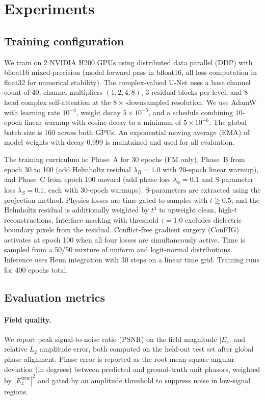 \section{\label{sec:experiments}Experiments}

\subsection{Training configuration}

We train on 2 NVIDIA H200 GPUs using distributed data parallel (DDP) with bfloat16 mixed-precision (model forward pass
in bfloat16, all loss computation in float32 for numerical stability). The complex-valued U-Net uses a base channel
count of 40, channel multipliers $(1, 2, 4, 8)$, 3 residual blocks per level, and 8-head complex self-attention at the
$8\times$-downsampled resolution. We use AdamW~\cite{Loshchilov2019AdamW} with learning rate $10^{-4}$, weight decay
$5 \times 10^{-5}$, and a schedule combining 10-epoch linear warmup with cosine decay to a minimum of $5 \times
10^{-6}$. The global batch size is 160 across both GPUs. An exponential moving average (EMA) of model weights with
decay 0.999 is maintained and used for all evaluation.

The training curriculum is: Phase~A for 30 epochs (FM only), Phase~B from epoch 30 to 100 (add Helmholtz residual
$\lambda_R = 1.0$ with 20-epoch linear warmup), and Phase~C from epoch 100 onward (add phase loss $\lambda_\phi =
0.1$ and S-parameter loss $\lambda_S = 0.1$, each with 30-epoch warmups). S-parameters are extracted using the
projection method. Physics losses are time-gated to samples with $t \geq 0.5$, and the Helmholtz residual is
additionally weighted by $t^4$ to upweight clean, high-$t$ reconstructions. Interface masking with threshold $\tau =
1.0$ excludes dielectric boundary pixels from the residual. Conflict-free gradient surgery
(ConFIG)~\cite{ConFIG2025} activates at epoch 100 when all four losses are simultaneously active.
Time is sampled from a 50/50 mixture of uniform and logit-normal distributions. Inference uses Heun integration with
30 steps on a linear time grid. Training runs for 400 epochs total.

\subsection{Evaluation metrics}

\paragraph{Field quality.}
We report peak signal-to-noise ratio (PSNR) on the field magnitude $|E_z|$ and relative $L_2$ amplitude error, both
computed on the held-out test set after global phase alignment. Phase error is reported as the root-mean-square angular
deviation (in degrees) between predicted and ground-truth unit phasors, weighted by $|E_z^\text{true}|^2$ and gated by
an amplitude threshold to suppress noise in low-signal regions.

